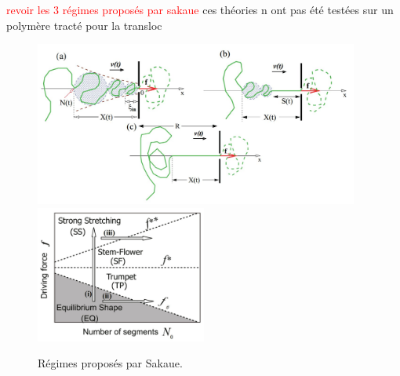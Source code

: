 \documentclass[a4paper,11pt]{article}
\begin{document}
 
 \textcolor{red}{revoir les 3 régimes proposés par sakaue}
 ces théories n ont pas été testées sur un polymère tracté pour la transloc
 
 
 \begin{figure}[H]
\begin{center}
\includegraphics[width=0.95\textwidth]{regimeprofiles.jpg}
\includegraphics[width=0.5\textwidth]{regimedistrib.jpg} 

\caption{Régimes proposés par Sakaue.}
\label{regimeprofiles}
\end{center}
\end{figure}
\end{document}
